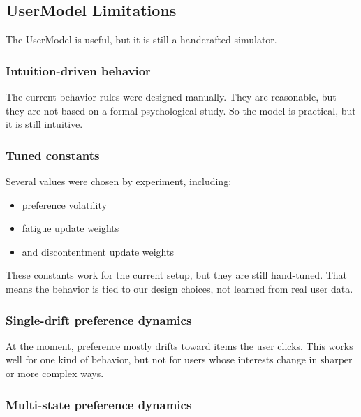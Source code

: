 
\subsection{UserModel Limitations}

The UserModel is useful, but it is still a handcrafted simulator.

\subsubsection{Intuition-driven behavior}

The current behavior rules were designed manually. 
They are reasonable, but they are not based on a formal psychological study. 
So the model is practical, but it is still intuitive.

\subsubsection{Tuned constants}

Several values were chosen by experiment, including:

\begin{itemize}
    \item preference volatility
    \item fatigue update weights
    \item and discontentment update weights
\end{itemize}

These constants work for the current setup, but they are still hand-tuned. 
That means the behavior is tied to our design choices, not learned from real user data. 

\subsubsection{Single-drift preference dynamics}

At the moment, preference mostly drifts toward items the user clicks. 
This works well for one kind of behavior, but not for users whose interests change in sharper or more complex ways.

\subsubsection{Multi-state preference dynamics}


